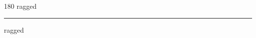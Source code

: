 
\begin{frame}
\begin{center}
\begin{turn}{180}
{\fontsize{2.5cm}{1em}\selectfont ragged}
\end{turn}
\vspace{1em}\par  
\hrule
\vspace{1em}\par  
{\fontsize{2.5cm}{1em}\selectfont ragged}
\end{center}
\end{frame}
